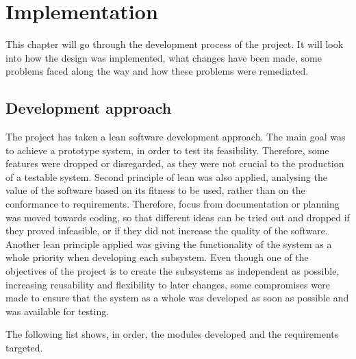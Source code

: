 \chapter{Implementation}
This chapter will go through the development process of the project. It will look into how the design was implemented, what changes have been made, some problems  faced along the way and how these problems were remediated.
\section{Development approach}
The project has taken a lean software development approach. The main goal was to achieve a prototype system, in order to test its feasibility. Therefore, some features were dropped or disregarded, as they were not crucial to the production of a testable system. Second principle of lean was also applied, analysing the value of the software based on its fitness to be used, rather than on the conformance to requirements. Therefore, focus from documentation or planning was moved towards coding, so that different ideas can be tried out and dropped if they proved infeasible, or if they did not increase the quality of the software. Another lean principle applied was giving the functionality of the system as a whole priority when developing each subsystem. Even though one of the objectives of the project is to create the subsystems as independent as possible, increasing reusability and flexibility to later changes, some compromises were made to ensure that the system as a whole was developed as soon as possible and was available for testing.

\noindent The following list shows, in order, the modules developed and the requirements targeted.

